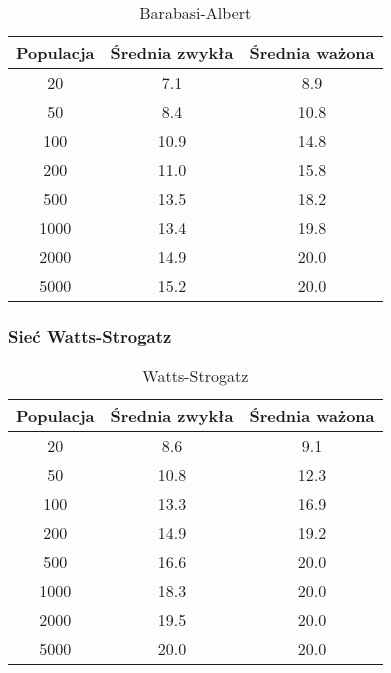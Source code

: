\begin{table}[htbp]
    \centering
    \begin{tabular}{c|c|c}
        \hline
        Populacja & Średnia zwykła & Średnia ważona \\
        \hline
        20        & 7.1            & 8.9            \\
        50        & 8.4            & 10.8           \\
        100       & 10.9           & 14.8           \\
        200       & 11.0           & 15.8           \\
        500       & 13.5           & 18.2           \\
        1000      & 13.4           & 19.8           \\
        2000      & 14.9           & 20.0           \\
        5000      & 15.2           & 20.0           \\
    \end{tabular}
    \caption{Barabasi-Albert}
    \label{tab:barabasi_albert}
\end{table}

\subsubsection{Sieć Watts-Strogatz}

\begin{table}[htbp]
    \centering
    \begin{tabular}{c|c|c}
        \hline
        Populacja & Średnia zwykła & Średnia ważona \\
        \hline
        20        & 8.6            & 9.1            \\
        50        & 10.8           & 12.3           \\
        100       & 13.3           & 16.9           \\
        200       & 14.9           & 19.2           \\
        500       & 16.6           & 20.0           \\
        1000      & 18.3           & 20.0           \\
        2000      & 19.5           & 20.0           \\
        5000      & 20.0           & 20.0           \\
    \end{tabular}
    \caption{Watts-Strogatz}
    \label{tab:watts_strogatz}
\end{table}


